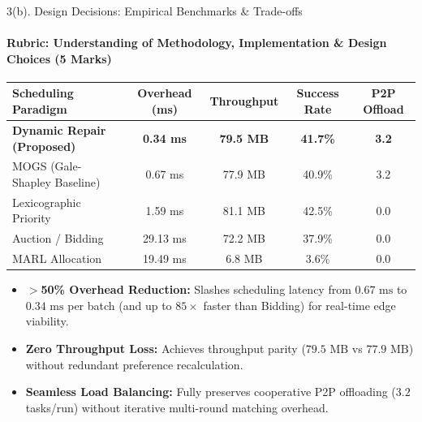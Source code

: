 \documentclass[aspectratio=169, 11pt]{beamer}
\begin{document}
\begin{frame}{3(b). Design Decisions: Empirical Benchmarks \& Trade-offs}
    \framesubtitle{Rubric: Understanding of Methodology, Implementation \& Design Choices (5 Marks)}
    
    \centering
    \footnotesize
    \renewcommand{\arraystretch}{1.2}
    \begin{tabular}{lcccc}
        \toprule
        \textbf{Scheduling Paradigm} & \textbf{Overhead (ms)} & \textbf{Throughput} & \textbf{Success Rate} & \textbf{P2P Offload} \\
        \midrule
        \textbf{Dynamic Repair (Proposed)} & \textbf{0.34 ms} & \textbf{79.5 MB} & \textbf{41.7\%} & \textbf{3.2} \\
        MOGS (Gale-Shapley Baseline)       & 0.67 ms          & 77.9 MB          & 40.9\%          & 3.2 \\
        Lexicographic Priority             & 1.59 ms          & 81.1 MB          & 42.5\%          & 0.0 \\
        Auction / Bidding                  & 29.13 ms         & 72.2 MB          & 37.9\%          & 0.0 \\
        MARL Allocation                    & 19.49 ms         & 6.8 MB           & 3.6\%           & 0.0 \\
        \bottomrule
    \end{tabular}
    \vspace{0.3cm}

    \begin{itemize}\setlength{\itemsep}{6pt}\small
        \item \textbf{$>$50\% Overhead Reduction:} Slashes scheduling latency from $0.67\text{ ms}$ to $0.34\text{ ms}$ per batch (and up to $85\times$ faster than Bidding) for real-time edge viability.
        \item \textbf{Zero Throughput Loss:} Achieves throughput parity ($79.5\text{ MB}$ vs $77.9\text{ MB}$) without redundant preference recalculation.
        \item \textbf{Seamless Load Balancing:} Fully preserves cooperative P2P offloading ($3.2$ tasks/run) without iterative multi-round matching overhead.
    \end{itemize}
\end{frame}
\end{document}
